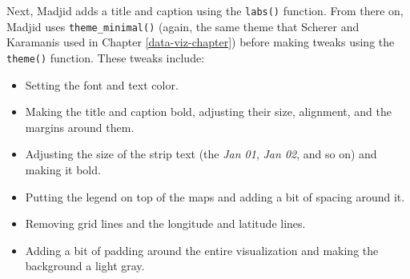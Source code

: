 \documentclass[
]{book}
\providecommand{\tightlist}{%
  \setlength{\itemsep}{0pt}\setlength{\parskip}{0pt}}
\begin{document}
Next, Madjid adds a title and caption using the \texttt{labs()} function. From there on, Madjid uses \texttt{theme\_minimal()} (again, the same theme that Scherer and Karamanis used in Chapter \ref{data-viz-chapter}) before making tweaks using the \texttt{theme()} function. These tweaks include:

\begin{itemize}
\tightlist
\item
  Setting the font and text color.
\item
  Making the title and caption bold, adjusting their size, alignment, and the margins around them.
\item
  Adjusting the size of the strip text (the \emph{Jan 01}, \emph{Jan 02}, and so on) and making it bold.
\item
  Putting the legend on top of the maps and adding a bit of spacing around it.
\item
  Removing grid lines and the longitude and latitude lines.
\item
  Adding a bit of padding around the entire visualization and making the background a light gray.
\end{itemize}
\end{document}
